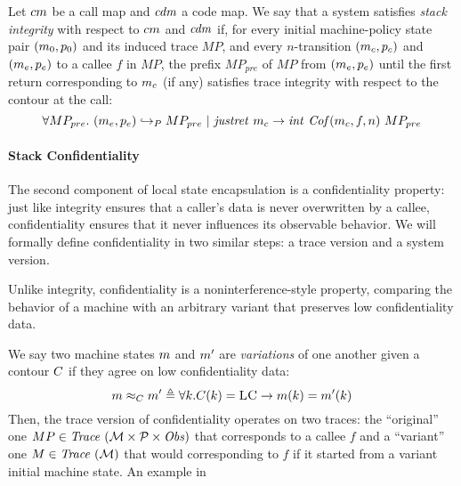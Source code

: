 \documentclass[acmsmall,review,anonymous]{acmart}\settopmatter{printfolios=true,printccs=false,printacmref=false}
\begin{document}
Let $cm$ be a call map and $\mathit{cdm}$ a code map. We say that a
system satisfies {\em stack integrity} with respect to $cm$ and
$\mathit{cdm}$ if, for every initial machine-policy state pair $(m_0,
p_0)$ and its induced trace $MP$, and every $n$-transition
$(m_c, p_c)$ and $(m_e, p_e)$ to a callee $f$ in $MP$,
the prefix $MP_{pre}$ of $MP$ from $(m_e, p_e)$ until the first
return corresponding to $m_c$ (if any) satisfies trace integrity
with respect to the contour at the call:
%
$$\forall MP_{pre}. ~ (m_e,p_e) \hookrightarrow_P
MP_{pre} ~ | ~ \mathit{justret}\ m_c \rightarrow
\mathit{int}~\mathit{Cof}(m_c, f, n)~MP_{pre}$$

\paragraph*{Stack Confidentiality}

The second component of local state encapsulation is a confidentiality
property: just like integrity ensures that a caller's data is never
overwritten by a callee, confidentiality ensures that it never
influences its observable behavior. We will formally define
confidentiality in two similar steps: a trace version and a system
version.

Unlike integrity, confidentiality is a noninterference-style property,
comparing the behavior of a machine with an arbitrary variant that
preserves low confidentiality data.

We say two machine states $m$ and $m'$ are {\em variations} of one
another given a contour $C$ if they agree on low
confidentiality data:
%
\[
m \approx_C m' \triangleq \forall k .
C(k) = \textsc{LC} \rightarrow m(k) =
m'(k)
\]
%
Then, the trace version of confidentiality operates on two traces: the
``original'' one $MP \in \mathit{Trace}~({\mathcal M} \times \mathcal{P} \times \mathit{Obs})$ that corresponds to a callee $f$
and a ``variant'' one $M \in \mathit{Trace}~({\mathcal M})$ that would corresponding to $f$
if it started from a variant initial machine state. An example in
\end{document}
